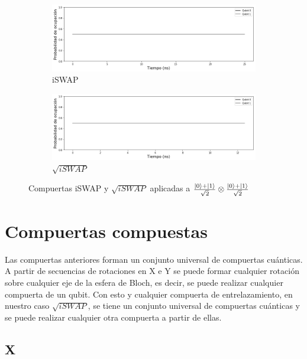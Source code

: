 \begin{figure}[H]
    \centering
    \begin{subfigure}[m]{0.49\textwidth}
        \centering \includegraphics[width=1\linewidth]{img/iswap0101.png}
        \caption{iSWAP}
    \end{subfigure}
    \begin{subfigure}[m]{0.49\textwidth}
        \centering \includegraphics[width=1\linewidth]{img/sqrtiswap0101.png}
        \caption{$\sqrt{iSWAP}$}
    \end{subfigure}
    \caption[Compuertas iSWAP y $\sqrt{iSWAP}$ aplicadas a $\frac{\ket{0} + \ket{1}}{\sqrt{2}} \otimes \frac{\ket{0} + \ket{1}}{\sqrt{2}}$]{Compuertas iSWAP y $\sqrt{iSWAP}$ aplicadas a $\frac{\ket{0} + \ket{1}}{\sqrt{2}} \otimes \frac{\ket{0} + \ket{1}}{\sqrt{2}}$}
\label{fig:iswapsqrtiswap0101}
\end{figure}

\section{Compuertas compuestas}

Las compuertas anteriores forman un conjunto universal de compuertas cuánticas. A partir de secuencias de rotaciones en X e Y se puede formar cualquier rotación sobre cualquier eje de la esfera de Bloch, es decir, se puede realizar cualquier compuerta de un qubit. Con esto y cualquier compuerta de entrelazamiento, en nuestro caso $\sqrt{iSWAP}$, se tiene un conjunto universal de compuertas cuánticas y se puede realizar cualquier otra compuerta a partir de ellas.

\subsection{X}

